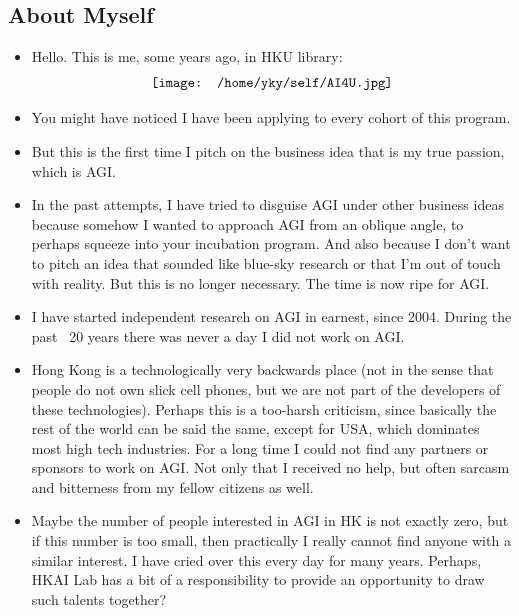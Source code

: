 \begin{preview}
\begin{minipage}{\textwidth}
\setlength{\parskip}{0.4\baselineskip}

\maketitle

\section{About Myself}

\begin{itemize}

	\item Hello. This is me, some years ago, in HKU library: \\
	\begin{equation}
	\nonumber
	\vcenter{\hbox{\texttt{[image: /home/yky/self/AI4U.jpg]}}}
	\end{equation}

	\item You might have noticed I have been applying to every cohort of this program.
	
	\item But this is the first time I pitch on the business idea that is my true passion, which is AGI.
	
	\item In the past attempts, I have tried to disguise AGI under other business ideas because somehow I wanted to approach AGI from an oblique angle, to perhaps squeeze into your incubation program.  And also because I don't want to pitch an idea that sounded like blue-sky research or that I'm out of touch with reality.  But this is no longer necessary.  The time is now ripe for AGI.
	
	\item I have started independent research on AGI in earnest, since 2004.  During the past ~20 years there was never a day I did not work on AGI.
	
	\item Hong Kong is a technologically very backwards place (not in the sense that people do not own slick cell phones, but we are not part of the developers of these technologies).  Perhaps this is a too-harsh criticism, since basically the rest of the world can be said the same, except for USA, which dominates most high tech industries.  For a long time I could not find any partners or sponsors to work on AGI.  Not only that I received no help, but often sarcasm and bitterness from my fellow citizens as well.
	
	\item Maybe the number of people interested in AGI in HK is not exactly zero, but if this number is too small, then practically I really cannot find anyone with a similar interest.  I have cried over this every day for many years.  Perhaps, HKAI Lab has a bit of a responsibility to provide an opportunity to draw such talents together?
	
\end{itemize}
\end{minipage}
\end{preview}

